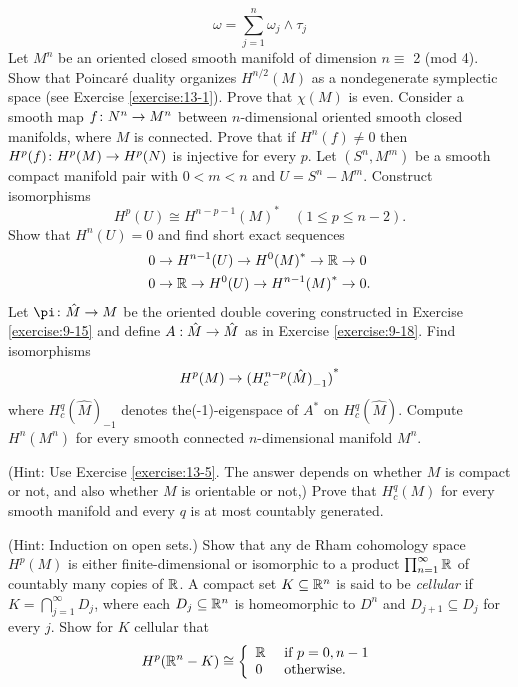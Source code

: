 \begin{enumerate}[\theexercise.1]
    \[
      \omega  = \sum_{{j = 1}}^{n}{\omega }_{j} \land  {\tau }_{j}
    \]
  \NewItem Let ${M}^{n}$ be an oriented closed smooth manifold of dimension $n \equiv$ 2 (mod 4). Show that Poincar\'e duality organizes ${H}^{n/2}( M)$ as a nondegenerate symplectic space (see Exercise \ref{exercise:13-1}). Prove that $\chi ( M)$ is even.
  \NewItem Consider a smooth map $f\colon {N}^{n} \rightarrow  {M}^{n}$ between $n$-dimensional oriented smooth closed manifolds, where $M$ is connected. Prove that if ${H}^{n}( f)  \neq  0$ then ${H}^{p}( f)\colon {H}^{p}( M)  \rightarrow  {H}^{p}( N)$ is injective for every $p$.
  \NewItem Let $( {{S}^{n},{M}^{m}})$ be a smooth compact manifold pair with $0 < m < n$ and $U = {S}^{n}- {M}^{m}$. Construct isomorphisms
    \[
      {H}^{p}( U)  \cong  {H}^{n- p- 1}{( M) }^*\quad( {1 \leq  p \leq  n- 2}).
    \]
    Show that ${H}^{n}( U)  = 0$ and find short exact sequences
    \[
    \begin{aligned}
      0 & \rightarrow  {H}^{n- 1}( U)  \rightarrow  {H}^{0}{( M) }^* \rightarrow  \mathbb{R} \rightarrow  0 \\
      0 & \rightarrow  \mathbb{R} \rightarrow  {H}^{0}( U)  \rightarrow  {H}^{n- 1}{( M) }^* \rightarrow  0.
    \end{aligned}
    \]
  \NewItem Let $\pi\colon  \hat{M} \ra  M$ be the oriented double covering constructed in Exercise \ref{exercise:9-15} and define $A : \hat{M} \rightarrow  \hat{M}$ as in Exercise \ref{exercise:9-18}. Find isomorphisms
    \[
      {H}^{p}( M)  \rightarrow  {( {H}_{c}^{n- p}{( \hat{M}) }_{-1}) }^*
    \]
    where ${H}_{c}^{q}{( \hat{M}) }_{-1}$ denotes the(-1)-eigenspace of ${A}^*$ on ${H}_{c}^{q}( \hat{M})$.
  \NewItem Compute ${H}^{n}( {M}^{n})$ for every smooth connected $n$-dimensional manifold ${M}^{n}$.
    \par(Hint: Use Exercise \ref{exercise:13-5}. The answer depends on whether $M$ is compact or not, and also whether $M$ is orientable or not,)
  \NewItem Prove that ${H}_{c}^{q}( M)$ for every smooth manifold and every $q$ is at most countably generated.
    \par(Hint: Induction on open sets.)
  \NewItem Show that any de Rham cohomology space ${H}^{p}( M)$ is either finite-dimensional or isomorphic to a product $\prod_{{n = 1}}^{\infty }\mathbb{R}$ of countably many copies of $\mathbb{R}$.
  \NewItem A compact set $K \subseteq  {\ensuremath{\mathbb{R}}}^{n}$ is said to be \textit{cellular} if $K = \bigcap_{{j = 1}}^{\infty }{D}_{j}$, where each ${D}_{j} \subseteq  {\ensuremath{\mathbb{R}}}^{n}$ is homeomorphic to ${D}^{n}$ and ${D}_{j + 1} \subseteq  {D}_{j}$ for every $j$. Show for $K$ cellular that
    \[
      {H}^{p}( {{\mathbb{R}}^{n}- K})  \cong  \left\{  \begin{array}{ll} \mathbb{R} & \text{ if }p = 0,n- 1 \\  0 & \text{ otherwise. } \end{array}\right.
\]
\end{enumerate}
